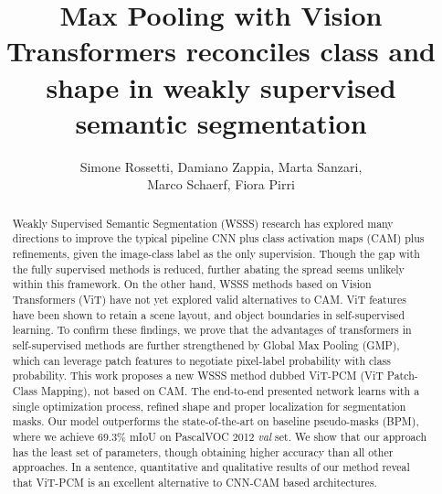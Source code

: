 \documentclass[runningheads]{styles/llncs}
\begin{document}
\pagestyle{headings}
\mainmatter


\title{Max Pooling with Vision Transformers reconciles class and shape in weakly supervised semantic segmentation } 




\author{Simone Rossetti,
Damiano Zappia,
Marta Sanzari,\\
Marco Schaerf,
Fiora Pirri}


\maketitle
{}
\begin{abstract}
Weakly Supervised Semantic Segmentation (WSSS) research
has explored many directions to improve the typical pipeline CNN plus
class activation maps (CAM) plus refinements, given the image-class label as the only supervision.
Though the gap with the fully supervised methods is reduced,
further abating the spread seems unlikely within this framework. 
On the other hand, WSSS methods based on Vision Transformers (ViT) have not yet explored valid alternatives to CAM. ViT features have been shown to retain a scene layout, and object boundaries in self-supervised learning. To confirm these findings, we prove that the advantages of transformers in self-supervised methods are further strengthened by Global Max Pooling (GMP), which can leverage patch features to negotiate pixel-label probability with class probability. This work proposes a new WSSS method dubbed ViT-PCM (ViT Patch-Class Mapping), not based on CAM.
The end-to-end presented network learns with a single optimization process, refined shape and proper localization for segmentation masks. Our model outperforms the state-of-the-art on baseline pseudo-masks (BPM), where we achieve 69.3\% mIoU on PascalVOC 2012 \textit{val} set. We show that our approach has the least set of parameters, though obtaining
higher accuracy than all other approaches. In a sentence, quantitative and qualitative results
of our method reveal that ViT-PCM is an excellent alternative to
CNN-CAM based architectures.

\end{abstract}
\end{document}
